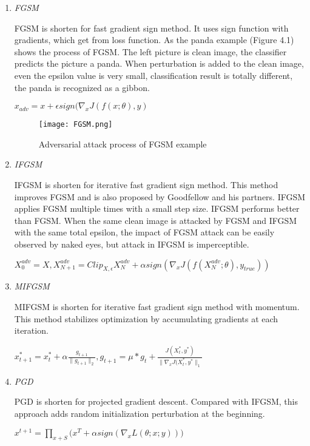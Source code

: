 \begin{enumerate}
\item \textit{FGSM}

FGSM is shorten for fast gradient sign method\cite{goodfellow_explaining_2015}. It uses sign function with gradients, which get from loss function. As the panda example (Figure 4.1) shows the process of FGSM. The left picture is clean image, the classifier predicts the picture a panda. When perturbation is added to the clean image, even the epsilon value is very small, classification result is totally different, the panda is recognized as a gibbon.
\begin{center}
          \(x_{adv} = x + \epsilon sign(\nabla_{x}J(f(x;\theta),y) \)
\end{center}
\begin{figure}[!htbp]
\centering
\texttt{[image: FGSM.png]}
\caption{Adversarial attack process of FGSM example}
\label{fig:FGSM}
\end{figure}
\item \textit{IFGSM} 

IFGSM\cite{kurakin_adversarial_2017} is shorten for iterative fast gradient sign method. This method improves FGSM and is also proposed by Goodfellow and his partners. IFGSM applies FGSM multiple times with a small step size. IFGSM performs better than FGSM. When the same clean image is attacked by FGSM and IFGSM with the same total epsilon, the impact of FGSM attack can be easily observed by naked eyes, but attack in IFGSM is imperceptible.
\begin{center}
          \(X_{0}^{adv} = X,  X_{N+1}^{adv}=Clip_{X,\epsilon}{X_{N}^{adv}+\alpha sign(\nabla_{x}J(f(X_{N}^{adv};\theta),y_{true}))} \)
\end{center}
 \item \textit{MIFGSM}
 
 MIFGSM\cite{dong_boosting_2018} is shorten for iterative fast gradient sign method with momentum. This method stabilizes optimization by accumulating gradients at each iteration.
  \begin{center}
          \(x^{*}_{t+1} =x^{*}_{t}+\alpha \frac{g_{t+1}}{\|g_{t+1}\|_{2}},
           g_{t+1} = \mu * g_{t}+\frac{J(X^{*}_{t},y^{*})}{\|\nabla_{x}J(X_{t}^{*},y^{*}\|_{1}} \)
\end{center}
 \item \textit{PGD}
 
 PGD\cite{madry_towards_2019} is shorten for projected gradient descent. Compared with IFGSM, this approach adds random initialization perturbation at the beginning.
 \begin{center}
          \(x^{t+1} =\prod_{x+S}({x^{T}+\alpha sign(\nabla_{x}L(\theta;x;y)))} \)
\end{center}
 

\end{enumerate}
